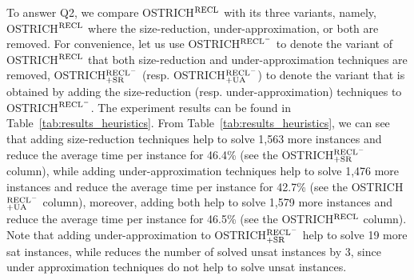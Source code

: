 To answer Q2, we compare OSTRICH$^{\rm RECL}$ with its three variants, namely, OSTRICH$^{\rm RECL}$ where the size-reduction, under-approximation, or both are removed. 
For convenience, let us use OSTRICH$^{\rm RECL^-}$ to denote the variant of OSTRICH$^{\rm RECL}$ that both size-reduction and under-approximation techniques are removed, 
OSTRICH$^{\rm RECL^-}_{+\rm SR}$ (resp. OSTRICH$^{\rm RECL^-}_{+\rm UA}$) to denote the variant that is obtained by adding the size-reduction (resp. under-approximation) techniques to OSTRICH$^{\rm RECL^-}$.
The experiment results can be found in Table~\ref{tab:results_heuristics}.
From Table~\ref{tab:results_heuristics}, we can see that adding size-reduction techniques help to solve 1,563 more instances and reduce the average time per instance for 46.4\% (see the OSTRICH$^{\rm RECL^-}_{\rm +SR}$ column), while adding under-approximation techniques help to solve 1,476 more instances and reduce the average time per instance for 42.7\% (see the OSTRICH$^{\rm RECL^-}_{\rm +UA}$ column), moreover, adding both help to solve 1,579 more instances and reduce the average time per instance for 46.5\% (see the OSTRICH$^{\rm RECL}$ column). Note that adding under-approximation to OSTRICH$^{\rm RECL^-}_{\rm +SR}$ help to solve 19 more sat instances, while reduces the number of solved unsat instances by 3, since under approximation techniques do not help to solve unsat instances.



